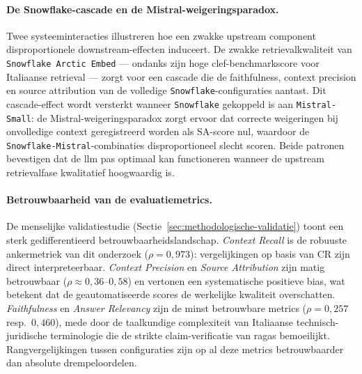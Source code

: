 \paragraph{De Snowflake-cascade en de Mistral-weigeringsparadox.}
Twee systeeminteracties illustreren hoe een zwakke upstream component disproportionele downstream-effecten induceert. De zwakke retrievalkwaliteit van \texttt{Snowflake Arctic Embed} — ondanks zijn hoge \gls{clef}-benchmarkscore voor Italiaanse retrieval — zorgt voor een cascade die de faithfulness, context precision en source attribution van de volledige \texttt{Snowflake}-configuraties aantast. Dit cascade-effect wordt versterkt wanneer \texttt{Snowflake} gekoppeld is aan \texttt{Mistral-Small}: de Mistral-weigeringsparadox zorgt ervoor dat correcte weigeringen bij onvolledige context geregistreerd worden als SA-score nul, waardoor de \texttt{Snowflake-Mistral}-combinaties disproportioneel slecht scoren. Beide patronen bevestigen dat de \gls{llm} pas optimaal kan functioneren wanneer de upstream retrievalfase kwalitatief hoogwaardig is.

\paragraph{Betrouwbaarheid van de evaluatiemetrics.}
De menselijke validatiestudie (Sectie~\ref{sec:methodologische-validatie}) toont een sterk gedifferentieerd betrouwbaarheidslandschap. \textit{Context Recall} is de robuuste ankermetriek van dit onderzoek ($\rho = 0{,}973$): vergelijkingen op basis van CR zijn direct interpreteerbaar. \textit{Context Precision} en \textit{Source Attribution} zijn matig betrouwbaar ($\rho \approx 0{,}36$--$0{,}58$) en vertonen een systematische positieve bias, wat betekent dat de geautomatiseerde scores de werkelijke kwaliteit overschatten. \textit{Faithfulness} en \textit{Answer Relevancy} zijn de minst betrouwbare metrics ($\rho = 0{,}257$ resp.\ $0{,}460$), mede door de taalkundige complexiteit van Italiaanse technisch-juridische terminologie die de strikte claim-verificatie van \gls{ragas} bemoeilijkt. Rangvergelijkingen tussen configuraties zijn op al deze metrics betrouwbaarder dan absolute drempeloordelen.